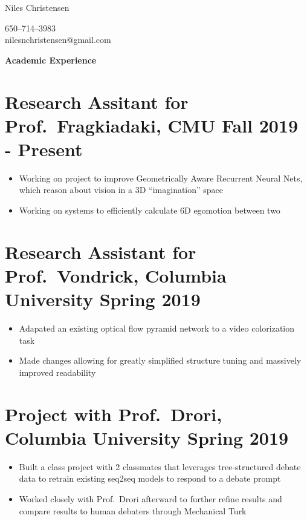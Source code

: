\documentclass{article}
\newenvironment{tightcenter}{%
  \setlength\topsep{0pt}
  \setlength\parskip{0pt}
  \begin{center}
}{%
  \end{center}
}
\begin{document}
\begin{tightcenter}
\begin{Large}Niles Christensen\\
\end{Large}
\begin{small}
650--714--3983\\
nilesnchristensen@gmail.com
\end{small}
\end{tightcenter}

\noindent
\large{\textbf{Academic Experience}}

\section*{\textbf{Research Assitant for Prof.\ Fragkiadaki, CMU \hfill Fall 2019 - Present}}
\begin{itemize}[noitemsep]
  \item Working on project to improve Geometrically Aware Recurrent Neural Nets, which reason about vision in a 3D ``imagination'' space
  \item Working on systems to efficiently calculate 6D egomotion between two 
\end{itemize}

\section*{\textbf{Research Assistant for Prof.\ Vondrick, Columbia University \hfill	Spring 2019}}
\begin{itemize}[noitemsep]
    \item Adapated an existing optical flow pyramid network to a video colorization task
    \item Made changes allowing for greatly simplified structure tuning and massively improved readability
\end{itemize}

\section*{\textbf{Project with Prof.\ Drori, Columbia University \hfill Spring 2019}}
\begin{itemize}[noitemsep]
  \item Built a class project with 2 classmates that leverages tree-structured debate data to retrain existing seq2seq models to respond to a debate prompt
  \item Worked closely with Prof.\ Drori afterward to further refine results and compare results to human debaters through Mechanical Turk
\end{itemize}
\end{document}
